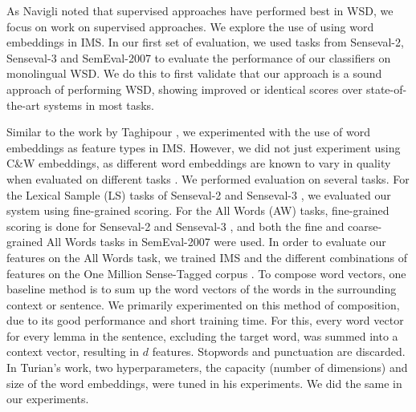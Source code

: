 \documentclass[11pt]{article}
\begin{document}
As Navigli  noted that supervised approaches have performed best in WSD, we focus on work on supervised approaches. 
We explore the use of using word embeddings in IMS. 
In our first set of evaluation, we used tasks from Senseval-2, Senseval-3 and SemEval-2007 to evaluate the performance of our classifiers on monolingual WSD. We do this to first validate that our approach is a sound approach of performing WSD, showing improved or identical scores over state-of-the-art systems in most tasks. 

Similar to the work by Taghipour , we experimented with the use of word embeddings as feature types in IMS. However, we did not just experiment using C\&W embeddings, as different word embeddings are known to vary in quality when evaluated on different tasks \cite{schnabel2015evaluation}. We performed evaluation on several tasks. For the Lexical Sample (LS) tasks of Senseval-2 \cite{senseval2-LS-kilgarriff2001} and Senseval-3 \cite{senseval3-LS-mihalcea2004}, we evaluated our system using fine-grained scoring. For the All Words (AW) tasks, fine-grained scoring is done for Senseval-2 \cite{senseval2-AW-palmer2001} and Senseval-3 \cite{senseval3-AW-snyder2004}, and both the fine \cite{semeval2007-fine-pradhan2007} and coarse-grained \cite{semeval2007-coarse-navigli2007} All Words tasks in SemEval-2007 were used. In order to evaluate our features on the All Words task, we trained IMS and the different combinations of features on the One Million Sense-Tagged corpus \cite{taghipour2015one}.
To compose word vectors, one baseline method is to sum up the word vectors of the words in the surrounding context or sentence. We primarily experimented on this method of composition, due to its good performance and short training time. For this, every word vector for every lemma in the sentence, excluding the target word, was summed into a context vector, resulting in $d$ features. Stopwords and punctuation are discarded. In Turian's  work, two hyperparameters, the capacity (number of dimensions) and size of the word embeddings, were tuned in his experiments. We did the same in our experiments.
\end{document}
